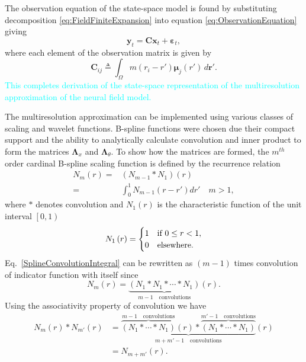 \documentclass[journal,a4paper]{IEEEtran}
\newcommand{\cut}[1]{\textcolor{cyan}{#1}}
\begin{document}
The observation equation of the state-space model is found by substituting decomposition \eqref{eq:FieldFiniteExpansion}
 into equation \eqref{eq:ObservationEquation} giving
\begin{equation}\label{eq:ReducedObservationEquation} 
	\mathbf{y}_t = \mathbf{C}\mathbf{x}_t + \boldsymbol{\varepsilon}_t,
\end{equation}
where each element of the observation matrix is given by
\begin{equation}
	\mathbf{C}_{ij} \triangleq \int_{\Omega}m(r_i - r')\boldsymbol{\mu}_j(r') \, d\mathbf{r}'.
\end{equation}
 \cut{This completes derivation of the state-space representation of the multiresolution approximation of the neural field model. }

The multiresolution approximation can be implemented using various classes of scaling and wavelet functions. B-spline functions were chosen due their compact support and the ability to analytically calculate convolution and inner product to form the matrices $ \boldsymbol\Lambda_x$ and $\boldsymbol \Lambda_{\theta}$. To show how the matrices are formed, the $m^{th}$ order cardinal B-spline scaling function is defined by the recurrence relation \cite{Chui1992} 
\begin{align}
N_{m}\left(r\right)=&\left(N_{m-1}\ast N_{1}\right)\left(r\right)\nonumber \\
=&\int_0^{1} N_{m-1}\left( r-r'\right)dr' \quad m>1,
\label{SplineConvolutionIntegral}
\end{align}
where $\ast$ denotes convolution and $N_1\left(r\right)$ is the characteristic function of the unit interval $\left[ 0,1\right)$
\begin{equation}
N_{1}\left(r\right)=
\begin{cases}
1 & \text{if $ 0\le r<1$}, \\
0 & \mathrm{elsewhere}.
\end{cases}
\end{equation}
Eq.~\ref{SplineConvolutionIntegral} can be rewritten as $(m-1)$ times convolution of indicator function with itself since
\begin{equation}
 N_{m}\left(r\right)=\underbrace{\left(N_{1}\ast N_{1}\ast \cdots \ast N_{1}\right)}_{m-1\quad \text{convolutions}}\left(r\right).
\end{equation}
Using the associativity property of convolution we have
\setlength{\arraycolsep}{0.0em}
\begin{align}\label{eq:BsplineConvolution}
N_{m}\left( r\right) \ast N_{m'}\left(r\right)&=\underbrace{\overbrace{\left(N_{1} \ast \cdots \ast N_{1}\right)}^{m-1 \quad \text{convolutions}}\left(r\right) \ast \overbrace{\left(N_{1} \ast \cdots \ast N_{1}\right)}^{m'-1\quad \text{convolutions}}}_{m+m'-1 \quad \text{convolutions}}\left(r\right)\nonumber\\
&=N_{m+m'}\left(r\right).
\end{align}
\end{document}
